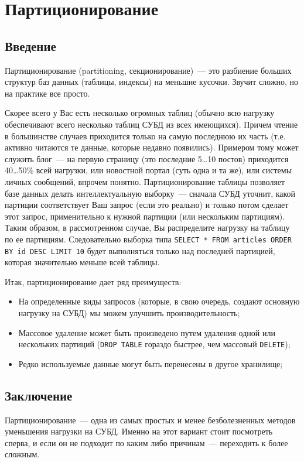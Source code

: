 \chapter{Партиционирование}
\label{sec:partitioning}

\begin{epigraphs}
\end{epigraphs}

\section{Введение}

Партиционирование (partitioning, секционирование)~--- это разбиение больших структур баз данных (таблицы, индексы) на меньшие кусочки. Звучит сложно, но на практике все просто.

Скорее всего у Вас есть несколько огромных таблиц (обычно всю нагрузку обеспечивают всего несколько таблиц СУБД из всех имеющихся). Причем чтение в большинстве случаев приходится только на самую последнюю их часть (т.е. активно читаются те данные, которые недавно появились). Примером тому может служить блог~--- на первую страницу (это последние 5\dots10 постов) приходится 40\dots50\% всей нагрузки, или новостной портал (суть одна и та же), или системы личных сообщений, впрочем понятно. Партиционирование таблицы позволяет базе данных делать интеллектуальную выборку~--- сначала СУБД уточнит, какой партиции соответствует Ваш запрос (если это реально) и только потом сделает этот запрос, применительно к нужной партиции (или нескольким партициям). Таким образом, в рассмотренном случае, Вы распределите нагрузку на таблицу по ее партициям. Следовательно выборка типа \lstinline!SELECT * FROM articles ORDER BY id DESC LIMIT 10! будет выполняться только над последней партицией, которая значительно меньше всей таблицы.

Итак, партиционирование дает ряд преимуществ:

\begin{itemize}
  \item На определенные виды запросов (которые, в свою очередь, создают основную нагрузку на СУБД) мы можем улучшить производительность;
  \item Массовое удаление может быть произведено путем удаления одной или нескольких партиций (\lstinline!DROP TABLE! гораздо быстрее, чем массовый \lstinline!DELETE!);
  \item Редко используемые данные могут быть перенесены в другое хранилище;
\end{itemize}






\section{Заключение}

Партиционирование~--- одна из самых простых и менее безболезненных методов уменьшения нагрузки на СУБД. Именно на этот вариант стоит посмотреть сперва, и если он не подходит по каким либо причинам~--- переходить к более сложным.
